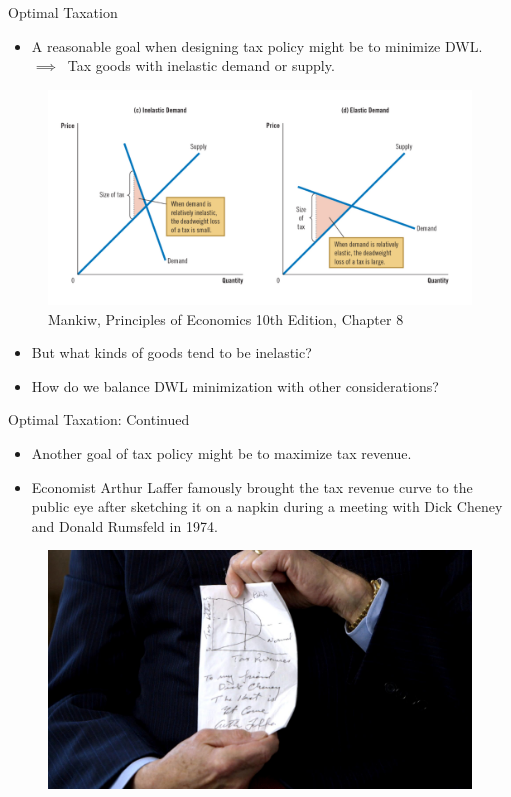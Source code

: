 \documentclass[9pt, handout]{beamer}
\begin{document}
\begin{frame}{Optimal Taxation}
    \begin{itemize}
        \item A reasonable goal when designing tax policy might be to minimize DWL.\\
        $\implies \:$ Tax goods with inelastic demand or supply.
    \end{itemize}
    \begin{figure}
        \centering
        \includegraphics[width=0.8\linewidth]{elasticity_and_dwl.png}
        \caption{Mankiw, Principles of Economics 10th Edition, Chapter 8}
    \end{figure}
    \begin{itemize}
        \item But what kinds of goods tend to be inelastic?
        \item How do we balance DWL minimization with other considerations?
    \end{itemize}
\end{frame}

\begin{frame}{Optimal Taxation: Continued}
    \begin{itemize}
        \item Another goal of tax policy might be to maximize tax revenue.
        \item Economist Arthur Laffer famously brought the tax revenue curve to the public eye after sketching it on a napkin during a meeting with Dick Cheney and Donald Rumsfeld in 1974.
    \end{itemize}
    \begin{figure}
        \centering
        \includegraphics[width=.85\linewidth]{laffer curve.jpg}
    \end{figure}
\end{frame}
\end{document}
